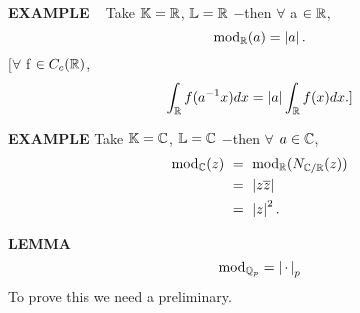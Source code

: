 \vspace{0.1cm}

\begin{x}{\small\bf EXAMPLE} \ %
Take $\mathbb{K} = \mathbb{R}$, $\mathbb{L} = \mathbb{R}$ $-$then $\forall$ a $\in \mathbb{R}$,
\[
\text{mod}_{\mathbb{R}}(a) = \left\vert a\right\vert.
\]
$[\forall$ f $\in C_c(\mathbb{R})$,
\[
\int_{\mathbb{R}} f(a^{-1}x)dx = \left\vert a\right\vert \int_{\mathbb{R}} f(x)dx.]
\]
\end{x}

\vspace{0.2cm}

\begin{x}{\small\bf EXAMPLE} %
Take $\mathbb{K} = \mathbb{C}$, $\mathbb{L} = \mathbb{C}$ $-$then $\forall$ $a\in \mathbb{C}$,
\[
\allowdisplaybreaks
\begin{aligned}
\modxs_{\C}(z) \ 
&= \  \modxs_{\R}(N_{\C/\R}(z)) \\
&= \ \abs{z\ov{z}} \\
&=\  \abs{z}^2.
\end{aligned}
\]
\end{x}

\vspace{0.1cm}

\begin{x}{\small\bf LEMMA} \ %
\[
\text{mod}_{\mathbb{Q}_p} = \left\vert\hspace{0.05cm} \cdot \hspace{0.05cm}\right\vert_{p}
\]
To prove this we need a preliminary.
\end{x}



